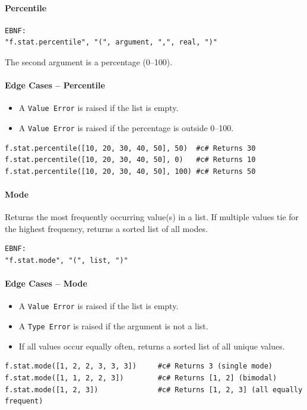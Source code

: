 \paragraph{Percentile}
\begin{verbatim}
EBNF:
"f.stat.percentile", "(", argument, ",", real, ")"
\end{verbatim}
The second argument is a percentage (0--100).

\paragraph{Edge Cases -- Percentile}
\begin{itemize}
\item A \texttt{Value Error} is raised if the list is empty.
\item A \texttt{Value Error} is raised if the percentage is outside 0--100.
\end{itemize}
\begin{verbatim}
f.stat.percentile([10, 20, 30, 40, 50], 50)  #c# Returns 30
f.stat.percentile([10, 20, 30, 40, 50], 0)   #c# Returns 10
f.stat.percentile([10, 20, 30, 40, 50], 100) #c# Returns 50
\end{verbatim}

\paragraph{Mode}
Returns the most frequently occurring value(s) in a list. If multiple values tie for the highest frequency, returns a sorted list of all modes.
\begin{verbatim}
EBNF:
"f.stat.mode", "(", list, ")"
\end{verbatim}

\paragraph{Edge Cases -- Mode}
\begin{itemize}
\item A \texttt{Value Error} is raised if the list is empty.
\item A \texttt{Type Error} is raised if the argument is not a list.
\item If all values occur equally often, returns a sorted list of all unique values.
\end{itemize}
\begin{verbatim}
f.stat.mode([1, 2, 2, 3, 3, 3])     #c# Returns 3 (single mode)
f.stat.mode([1, 1, 2, 2, 3])        #c# Returns [1, 2] (bimodal)
f.stat.mode([1, 2, 3])              #c# Returns [1, 2, 3] (all equally frequent)
\end{verbatim}

